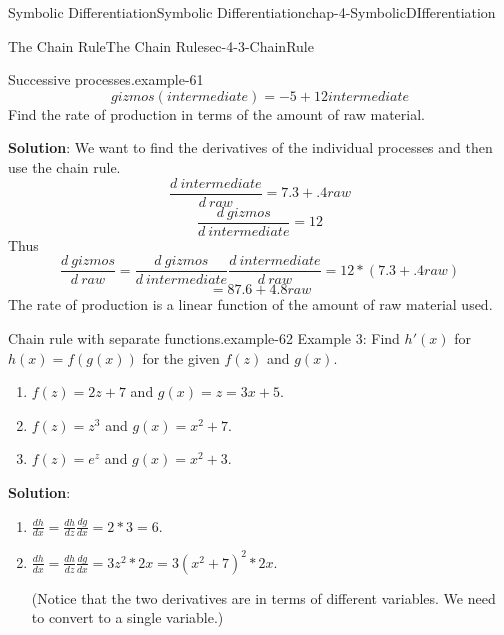 \documentclass[oneside,10pt,]{book}
\newcommand{\terminology}[1]{\textbf{#1}}
\numberwithin{equation}{section}
\begin{document}
\begin{chapterptx}{Symbolic Differentiation}{}{Symbolic Differentiation}{}{}{chap-4-SymbolicDIfferentiation}
\begin{sectionptx}{The Chain Rule}{}{The Chain Rule}{}{}{sec-4-3-ChainRule}
\begin{example}{Successive processes.}{example-61}
\begin{equation*}
\end{equation*}
%
\begin{equation*}
gizmos(intermediate)=-5+12 intermediate
\end{equation*}
\hypertarget{p-1644}{}%
Find the rate of production in terms of the amount of raw material.%
\par
\hypertarget{p-1645}{}%
\terminology{Solution}:  We want to find the derivatives of the individual processes and then use the chain rule.%
%
\begin{equation*}
\frac{d\ intermediate}{d\ raw}=7.3 +.4 raw
\end{equation*}
%
\begin{equation*}
\frac{d\  gizmos}{d\ intermediate}=12 
\end{equation*}
\hypertarget{p-1646}{}%
Thus%
%
\begin{equation*}
\frac{d\ gizmos}{d\ raw}=\frac{d\  gizmos}{d\ intermediate}
\frac{d\ intermediate}{d\ raw}=12*(7.3 +.4 raw)
\end{equation*}
%
\begin{equation*}
=87.6+4.8 raw
\end{equation*}
\hypertarget{p-1647}{}%
The rate of production is a linear function of the amount of raw material used.%
\end{example}
\begin{example}{Chain rule with separate functions.}{example-62}%
\hypertarget{p-1648}{}%
Example 3: Find \(h'(x)\) for \(h(x)=f(g(x))\) for the given \(f(z)\) and \(g(x)\).%
\leavevmode%
\begin{enumerate}[label=(\alph*)]
\item\hypertarget{li-503}{}\hypertarget{p-1649}{}%
\(f(z)=2z+7\) and \(g(x)=z=3 x+5\).%
\item\hypertarget{li-504}{}\hypertarget{p-1650}{}%
\(f(z)=z^3\) and \(g(x)=x^2+7\).%
\item\hypertarget{li-505}{}\hypertarget{p-1651}{}%
\(f(z)=e^z\) and \(g(x)=x^2+3\).%
\end{enumerate}
\hypertarget{p-1652}{}%
\terminology{Solution}:%
\leavevmode%
\begin{enumerate}[label=(\alph*)]
\item\hypertarget{li-506}{}\(\frac{dh}{dx}=\frac{dh}{dz}\frac{dg}{dx}=2*3=6.\)%
\item\hypertarget{li-507}{}\hypertarget{p-1653}{}%
\(\frac{dh}{dx}=\frac{dh}{dz}\frac{dg}{dx}
=3z^2*2x=3(x^2+7)^2*2x.\)%
\par
\hypertarget{p-1654}{}%
(Notice that the two derivatives are in terms of different variables.  We need to convert to a single variable.)%

\end{enumerate}
\end{example}
\end{sectionptx}
\end{chapterptx}
\end{document}
